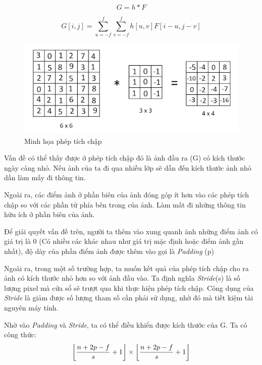 \documentclass[a4paper, 12pt]{article}
\DeclarePairedDelimiter\floor{\lfloor}{\rfloor}
\begin{document}
\begin{equation}
    G = h * F
\end{equation}

\begin{equation}
    G[i, j] = \sum_{u=-f}^{f}{\sum_{v=-f}^{f}{h[u, v]F[i-u, j-v]}}
\end{equation}

    \begin{figure}[H]
        \begin{center}
            \includegraphics[scale=0.8]{img/Conv2d.png}
            \caption{Minh họa phép tích chập}
        \end{center}
    \end{figure}

Vấn đề  có thể thấy được ở phép tích chập đó là ảnh đầu ra (G) có kích thước ngày càng nhỏ. Nếu ảnh của ta đi qua nhiều lớp sẽ dẫn đến kích thước ảnh nhỏ dần làm mấy đi thông tin.

Ngoài ra, các điểm ảnh ở phần biên của ảnh đóng góp ít hơn vào các phép tích chập so với các phần tử phía bên trong của ảnh. Làm mất đi những thông tin hữu ích ở phần biên của ảnh. 

Để giải quyết vấn đề trên, người ta thêm vào xung quanh ảnh những điểm ảnh có giá trị là 0 (Có nhiều các khác nhau như giá trị mặc định hoặc điểm ảnh gần nhất), độ dày của phần điểm ảnh được thêm vào  gọi là \textit{Padding} (p)

Ngoài ra, trong một số trường hợp, ta muốn kết quả của phép tích chập cho ra ảnh có kích thước nhỏ hơn so với ảnh đầu vào. Ta định nghĩa \textit{Stride}(s) là số lượng pixel mà cửa sổ sẽ trượt qua khi thực hiện phép tích chập. Công dụng của \textit{Stride} là giảm được số lượng tham số cần phải sử dụng, nhờ đó mà tiết kiệm tài nguyên máy tính.  

Nhờ vào \textit{Padding} và \textit{Stride}, ta có thể điều khiển được kích thước của G. Ta có công thức:
\begin{equation}
    \floor*{\frac{n+2p-f}{s} + 1} \times \floor*{\frac{n+2p-f}{s} + 1}  
\end{equation}
\end{document}
